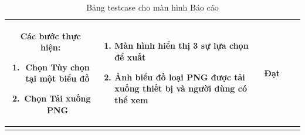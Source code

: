 \begin{longtable}{|c|m{2.5cm}|m{5.5cm}|m{4.5cm}|c|}
\begin{itemize}
    \end{itemize}
    Các bước thực hiện: 
    \begin{enumerate}[label=\arabic*.]
        \item Chọn Tùy chọn tại một biểu đồ
        \item Chọn Tải xuống PNG
    \end{enumerate}
    & 
    \begin{enumerate}[label=\arabic*.]
        \item Màn hình hiển thị 3 sự lựa chọn để xuất
        \item Ảnh biểu đồ loại PNG được tải xuống thiết bị và người dùng có thể xem
    \end{enumerate} & Đạt \\
    \hline
    \caption{Bảng testcase cho màn hình Báo cáo}
\end{longtable}